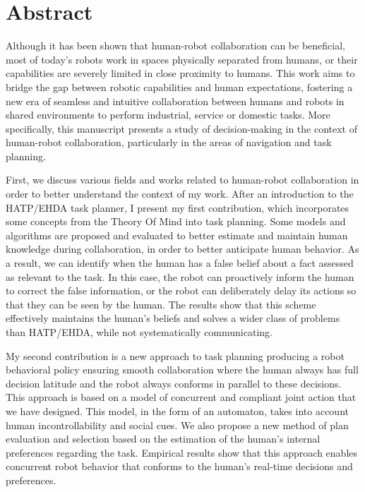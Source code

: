\chapter*{Abstract}


Although it has been shown that human-robot collaboration can be beneficial, most of today's robots work in spaces physically separated from humans, or their capabilities are severely limited in close proximity to humans. This work aims to bridge the gap between robotic capabilities and human expectations, fostering a new era of seamless and intuitive collaboration between humans and robots in shared environments to perform industrial, service or domestic tasks. More specifically, this manuscript presents a study of decision-making in the context of human-robot collaboration, particularly in the areas of navigation and task planning.

First, we discuss various fields and works related to human-robot collaboration in order to better understand the context of my work. After an introduction to the HATP/EHDA task planner, I present my first contribution, which incorporates some concepts from the Theory Of Mind into task planning. Some models and algorithms are proposed and evaluated to better estimate and maintain human knowledge during collaboration, in order to better anticipate human behavior. As a result, we can identify when the human has a false belief about a fact assessed as relevant to the task. In this case, the robot can proactively inform the human to correct the false information, or the robot can deliberately delay its actions so that they can be seen by the human. The results show that this scheme effectively maintains the human's beliefs and solves a wider class of problems than HATP/EHDA, while not systematically communicating.

My second contribution is a new approach to task planning producing a robot behavioral policy ensuring smooth collaboration where the human always has full decision latitude and the robot always conforms in parallel to these decisions. This approach is based on a model of concurrent and compliant joint action that we have designed. This model, in the form of an automaton, takes into account human incontrollability and social cues. We also propose a new method of plan evaluation and selection based on the estimation of the human's internal preferences regarding the task. Empirical results show that this approach enables concurrent robot behavior that conforms to the human's real-time decisions and preferences.

